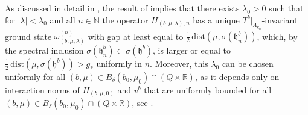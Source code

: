 \documentclass[a4paper]{article}
\newcommand{\w}{\omega}
\newcommand{\N}{\mathbb{N}}
\newcommand{\R}{\mathbb{R}}
\theoremstyle{plain}
\theoremstyle{definition}
\theoremstyle{remark}
\renewcommand{\(}{\left(}
\renewcommand{\)}{\right)}
\begin{document}
As discussed in detail  in \cite{WMMMT24}, the result of \cite{de2019persistence} implies  that there exists $\lambda_0>0$ such that for $|\lambda|<\lambda_0$  and all $n\in\N$  the operator $H_{(b,\mu,\lambda),n} $ has a unique $T^b|_{\Lambda_{k_n}}$-invariant ground state $\w_{(b,\mu,\lambda)}^{(n)}$ with  gap at least equal to $\frac{1}{2}\,\mathrm{dist}(\mu, \sigma(\mathfrak{h}_{n}^{b})  )$, which, by the spectral inclusion $\sigma(\mathfrak{h}^b_n) \subset \sigma(\mathfrak{h}^b) $,  is larger or equal to $\frac{1}{2}\, \mathrm{dist}(\mu, \sigma(\mathfrak{h}^{b})  )>g_*$ uniformly in $n$.  Moreover, this $\lambda_0$ can be chosen uniformly for all $(b,\mu)\in B_\delta(b_0,\mu_0)\cap(Q\times\R)$, as it depends only on interaction norms of $H_{(b,\mu,0)}$ and   $v^b$  that are uniformly bounded for all $(b,\mu)\in B_\delta(b_0,\mu_0)\cap(Q\times\R)$, see \cite{de2019persistence}.
\end{document}
